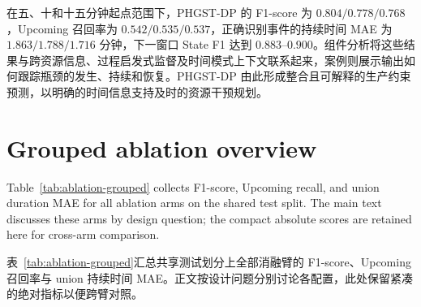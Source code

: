 \documentclass[a4paper,fleqn]{cas-dc}
\newcommand{\zhpara}[1]{%
  \par\begingroup\small\color{black!72}\noindent #1\par\endgroup}
\begin{document}
\zhpara{在五、十和十五分钟起点范围下，PHGST-DP 的 F1-score 为 $0.804/0.778/0.768$，Upcoming 召回率为 $0.542/0.535/0.537$，正确识别事件的持续时间 MAE 为 $1.863/1.788/1.716$ 分钟，下一窗口 State F1 达到 $0.883$--$0.900$。组件分析将这些结果与跨资源信息、过程启发式监督及时间模式上下文联系起来，案例则展示输出如何跟踪瓶颈的发生、持续和恢复。PHGST-DP 由此形成整合且可解释的生产约束预测，以明确的时间信息支持及时的资源干预规划。}

\clearpage
\appendix
\onecolumn
\section{Grouped ablation overview}\label{app:ablation-grouped}

Table~\ref{tab:ablation-grouped} collects F1-score, Upcoming recall, and union duration MAE for all ablation arms on the shared test split. The main text discusses these arms by design question; the compact absolute scores are retained here for cross-arm comparison.

\zhpara{表~\ref{tab:ablation-grouped}汇总共享测试划分上全部消融臂的 F1-score、Upcoming 召回率与 union 持续时间 MAE。正文按设计问题分别讨论各配置，此处保留紧凑的绝对指标以便跨臂对照。}
\end{document}
